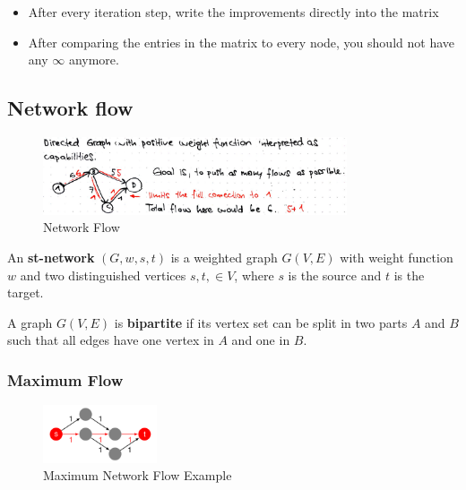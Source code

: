 \begin{itemize}
    \item After every iteration step, write the improvements directly into the matrix
    \item After comparing the entries in the matrix to every node, you should not have any $\infty$ anymore.
\end{itemize}

\clearpage
\subsection{Network flow}
\begin{figure}[H]
\centering
\includegraphics[width=0.8\textwidth]{figures/networkFlow.png}
\caption{Network Flow}
\end{figure}

\begin{tcolorbox}[colback=red!5!white,colframe=red!75!black]
An \textbf{st-network} $(G, w, s, t)$ is a weighted graph $G(V,E)$ with weight function $w$ and two distinguished vertices $s,t, \in V$, where $s$ is the source and $t$ is the target.
\end{tcolorbox}

\begin{tcolorbox}[colback=red!5!white,colframe=red!75!black]
A graph $G(V,E)$ is \textbf{bipartite} if its vertex set can be split in two parts $A$ and $B$ such that all edges have one vertex in $A$ and one in $B$.
\end{tcolorbox}

\subsubsection{Maximum Flow}

\begin{figure}[H]
\centering
\includegraphics[width=0.3\textwidth]{figures/maximumFlow.png}
\caption{Maximum Network Flow Example}
\end{figure}

